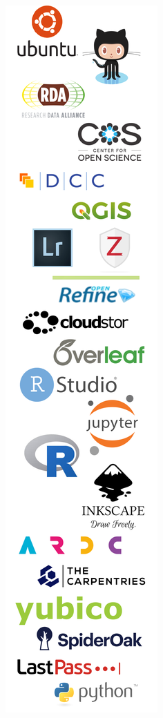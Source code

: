 \documentclass[17pt, a2paper, portrait]{tikzposter}
\begin{document}
\begin{columns}
{}
%
{
\centering
\includegraphics[width=1.12\linewidth]{images/poster-logos.png}
}


\end{columns}
\end{document}
